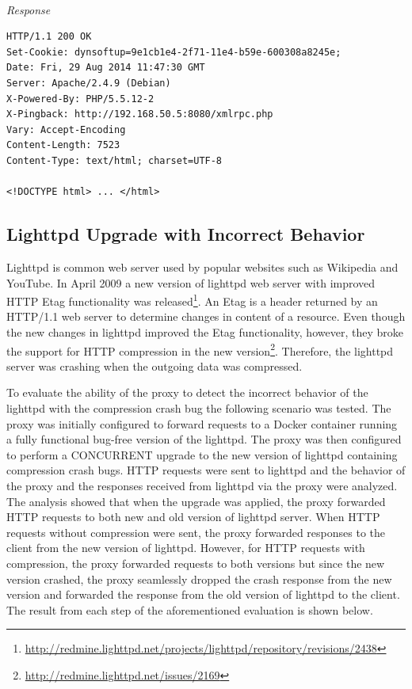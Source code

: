\documentclass[a4paper,11pt,twoside]{report}
\begin{document}
\noindent\\
\textit{Response}
\begin{lstlisting}[language=terminal] 
HTTP/1.1 200 OK
Set-Cookie: dynsoftup=9e1cb1e4-2f71-11e4-b59e-600308a8245e;
Date: Fri, 29 Aug 2014 11:47:30 GMT
Server: Apache/2.4.9 (Debian)
X-Powered-By: PHP/5.5.12-2
X-Pingback: http://192.168.50.5:8080/xmlrpc.php
Vary: Accept-Encoding
Content-Length: 7523
Content-Type: text/html; charset=UTF-8

<!DOCTYPE html> ... </html>
\end{lstlisting}
 


\subsection{Lighttpd Upgrade with Incorrect Behavior} 
Lighttpd is common web server used by popular websites such as Wikipedia and YouTube. In April 2009 a new version of lighttpd web server with improved HTTP Etag functionality was released\footnote{\url{http://redmine.lighttpd.net/projects/lighttpd/repository/revisions/2438}}. An Etag is a header returned by an HTTP/1.1 web server to determine changes in content of a resource. Even though the new changes in lighttpd improved the Etag functionality, however, they broke the support for HTTP compression in the new version\footnote{\url {http://redmine.lighttpd.net/issues/2169}}. Therefore, the lighttpd server was crashing when the outgoing data was compressed.

To evaluate the ability of the proxy to detect the incorrect behavior of the lighttpd with the compression crash bug the following scenario was tested. The proxy was initially configured to forward requests to a Docker container running a fully functional bug-free version of the lighttpd. The proxy was then configured to perform a CONCURRENT upgrade to the new version of lighttpd containing compression crash bugs. HTTP requests were sent to lighttpd and the behavior of the proxy and the responses received from lighttpd via the proxy were analyzed. The analysis showed that when the upgrade was applied, the proxy forwarded HTTP requests to both new and old version of lighttpd server. When HTTP requests without compression were sent, the proxy forwarded responses to the client from the new version of lighttpd. However, for HTTP requests with compression, the proxy forwarded requests to both versions but since the new version crashed, the proxy seamlessly dropped the crash response from the new version and forwarded the response from the old version of lighttpd to the client. The result from each step of the aforementioned evaluation is shown below.
\end{document}
